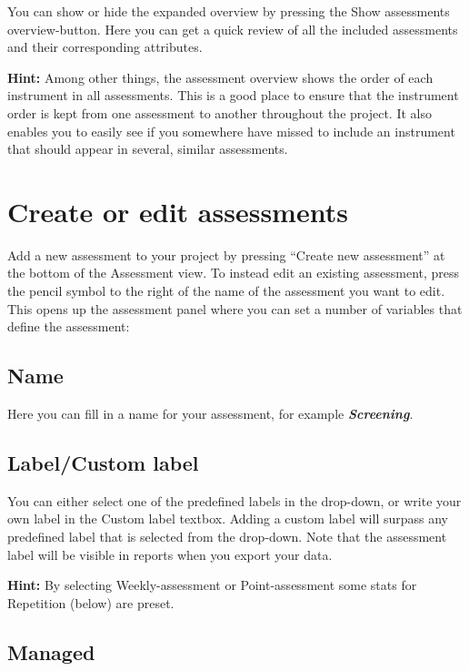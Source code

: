 \documentclass[]{book}
\begin{document}
You can show or hide the expanded overview by pressing the Show assessments overview-button. Here you can get a quick review of all the included assessments and their corresponding attributes.

\textbf{Hint:} Among other things, the assessment overview shows the order of each instrument in all assessments. This is a good place to ensure that the instrument order is kept from one assessment to another throughout the project. It also enables you to easily see if you somewhere have missed to include an instrument that should appear in several, similar assessments.

\hypertarget{create-or-edit-assessments}{%
\section{Create or edit assessments}\label{create-or-edit-assessments}}

Add a new assessment to your project by pressing ``Create new assessment'' at the bottom of the Assessment view. To instead edit an existing assessment, press the pencil symbol to the right of the name of the assessment you want to edit. This opens up the assessment panel where you can set a number of variables that define the assessment:

\hypertarget{name}{%
\subsection{Name}\label{name}}

Here you can fill in a name for your assessment, for example \textbf{\emph{Screening}}.

\hypertarget{labelcustom-label}{%
\subsection{Label/Custom label}\label{labelcustom-label}}

You can either select one of the predefined labels in the drop-down, or write your own label in the Custom label textbox. Adding a custom label will surpass any predefined label that is selected from the drop-down. Note that the assessment label will be visible in reports when you export your data.

\textbf{Hint:} By selecting Weekly-assessment or Point-assessment some stats for Repetition (below) are preset.

\hypertarget{managed}{%
\subsection{Managed}\label{managed}}
\end{document}
